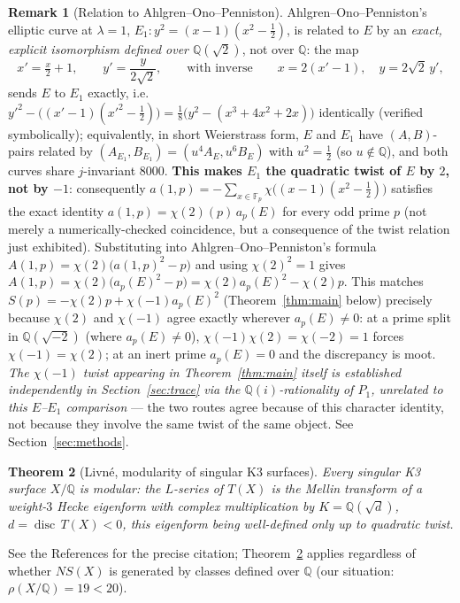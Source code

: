 \documentclass[11pt]{amsart}
\newtheorem{theorem}{Theorem}[section]
\theoremstyle{definition}
\newtheorem{remark}[theorem]{Remark}
\newcommand{\Fp}{\mathbb{F}_p}
\newcommand{\Q}{\mathbb{Q}}
\DeclareMathOperator{\disc}{disc}
\begin{document}
\begin{remark}[Relation to Ahlgren--Ono--Penniston]
\label{rem:aop}
Ahlgren--Ono--Penniston's elliptic curve at $\lambda=1$, $E_1:y^2=(x-1)(x^2-\tfrac12)$, is related to $E$ by an \emph{exact, explicit isomorphism defined over $\Q(\sqrt2)$}, not over $\Q$: the map
\[
x'=\tfrac x2+1,\qquad y'=\frac{y}{2\sqrt2},\qquad\text{with inverse}\qquad x=2(x'-1),\quad y=2\sqrt2\,y',
\]
sends $E$ to $E_1$ exactly, i.e.\ $y'^2-\bigl((x'-1)(x'^2-\tfrac12)\bigr)=\tfrac18\bigl(y^2-(x^3+4x^2+2x)\bigr)$ identically (verified symbolically); equivalently, in short Weierstrass form, $E$ and $E_1$ have $(A,B)$-pairs related by $(A_{E_1},B_{E_1})=(u^4A_E,u^6B_E)$ with $u^2=\tfrac12$ (so $u\notin\Q$), and both curves share $j$-invariant $8000$. \textbf{This makes $E_1$ the quadratic twist of $E$ by $2$, not by $-1$}: consequently $a(1,p)=-\sum_{x\in\Fp}\chi\bigl((x-1)(x^2-\tfrac12)\bigr)$ satisfies the exact identity $a(1,p)=\chi(2)(p)\,a_p(E)$ for every odd prime $p$ (not merely a numerically-checked coincidence, but a consequence of the twist relation just exhibited). Substituting into Ahlgren--Ono--Penniston's formula $A(1,p)=\chi(2)\bigl(a(1,p)^2-p\bigr)$ and using $\chi(2)^2=1$ gives $A(1,p)=\chi(2)\bigl(a_p(E)^2-p\bigr)=\chi(2)a_p(E)^2-\chi(2)p$. This matches $S(p)=-\chi(2)p+\chi(-1)a_p(E)^2$ (Theorem~\ref{thm:main} below) precisely because $\chi(2)$ and $\chi(-1)$ agree exactly wherever $a_p(E)\ne0$: at a prime split in $\Q(\sqrt{-2})$ (where $a_p(E)\ne0$), $\chi(-1)\chi(2)=\chi(-2)=1$ forces $\chi(-1)=\chi(2)$; at an inert prime $a_p(E)=0$ and the discrepancy is moot. \emph{The $\chi(-1)$ twist appearing in Theorem~\ref{thm:main} itself is established independently in Section~\ref{sec:trace} via the $\Q(i)$-rationality of $P_1$, unrelated to this $E$--$E_1$ comparison} — the two routes agree because of this character identity, not because they involve the same twist of the same object. See Section~\ref{sec:methods}.
\end{remark}

\begin{theorem}[Livn\'e, modularity of singular K3 surfaces]
\label{thm:livne}
Every singular K3 surface $X/\Q$ is modular: the $L$-series of $T(X)$ is the Mellin transform of a weight-$3$ Hecke eigenform with complex multiplication by $K=\Q(\sqrt{d})$, $d=\disc\,T(X)<0$, this eigenform being well-defined only up to quadratic twist.
\end{theorem}

See the References for the precise citation; Theorem~\ref{thm:livne} applies regardless of whether $NS(X)$ is generated by classes defined over $\Q$ (our situation: $\rho(X/\Q)=19<20$).
\end{document}
